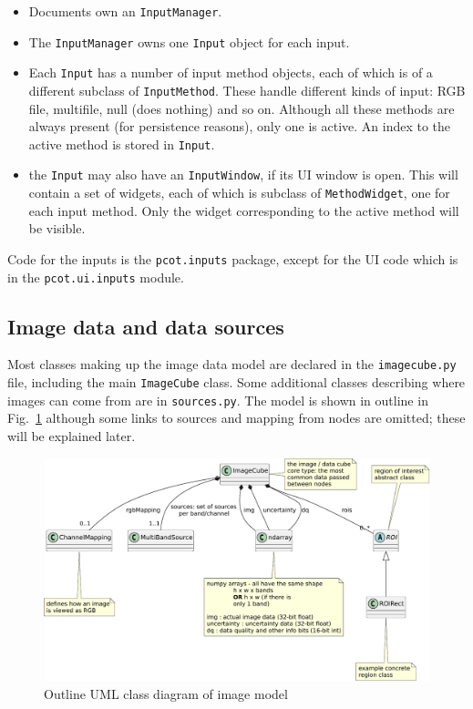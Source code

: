 \begin{itemize}
\item Documents own an \texttt{InputManager}.
\item The \texttt{InputManager} owns one \texttt{Input} object for each input.
\item Each \texttt{Input} has a number of input method objects,
each of which is of a different subclass of \texttt{InputMethod}.
These handle different kinds of input: RGB file, multifile, null (does nothing)
and so on. Although all these methods are
always present (for persistence reasons), only one is active. An index
to the active method is stored in \texttt{Input}.
\item the \texttt{Input} may also have an \texttt{InputWindow}, if its
UI window is open. This will contain a set of widgets, each of which is
subclass of \texttt{MethodWidget}, one for each input method. Only the widget
corresponding to the active method will be visible.
\end{itemize}
Code for the inputs is the \texttt{pcot.inputs} package, except for the UI
code which is in the \texttt{pcot.ui.inputs} module.
\clearpage

\subsection{Image data and data sources}
Most classes making up the image data model are declared in the
\texttt{imagecube.py} file, including the main \texttt{ImageCube} class.
Some additional classes describing where images can come from are in
\texttt{sources.py}. The model is shown in outline in
Fig.~\ref{image.pdf} although some links to sources and mapping from
nodes are omitted; these will be explained later.

\begin{figure}[ht]
\center
\includegraphics[width=5in]{image.pdf}
\caption{Outline UML class diagram of image model}
\label{image.pdf}
\end{figure}

